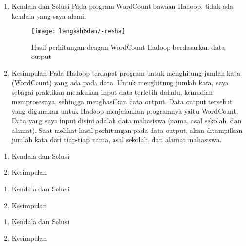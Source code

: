 \begin{enumerate}
\item Kendala dan Solusi
Pada program WordCount bawaan Hadoop, tidak ada kendala yang saya alami.

\begin{figure}[!ht]
\texttt{[image: langkah6dan7-resha]}
\caption{Hasil perhitungan dengan WordCount Hadoop berdasarkan data output}
\label{gam:perkuliahan-08-12}
\end{figure}

\item Kesimpulan
Pada Hadoop terdapat program untuk menghitung jumlah kata (WordCount) yang ada pada data. Untuk menghitung jumlah kata, saya sebagai praktikan melakukan input data terlebih dahulu, kemudian memprosesnya, sehingga menghasilkan data output. Data output tersebut yang digunakan untuk Hadoop menjalankan programnya yaitu WordCount.
Data yang saya input disini adalah data mahasiswa (nama, asal sekolah, dan alamat). Saat melihat hasil perhitungan pada data output, akan ditampilkan jumlah kata dari tiap-tiap nama, asal sekolah, dan alamat mahasiswa.

\end{enumerate}

\begin{enumerate}
\item Kendala dan Solusi

\item Kesimpulan

\end{enumerate}

\begin{enumerate}
\item Kendala dan Solusi

\item Kesimpulan

\end{enumerate}

\begin{enumerate}
\item Kendala dan Solusi

\item Kesimpulan

\end{enumerate}